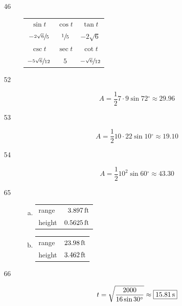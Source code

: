 \documentclass{exam}
\newcommand{\dg}{\ensuremath{^\circ}}
\begin{document}
\begin{description}
      \item[46]
        \begin{tabular}[H]{ccc}
          \toprule

          $\sin t$                  & $\cos t$       & $\tan t$      \\
          $-\sfrac{2 \sqrt{6}}{5}$  & $\sfrac{1}{5}$ & $-2 \sqrt{6}$ \\

          \midrule

          $\csc t$                  & $\sec t$       & $\cot t$ \\
          $-\sfrac{5 \sqrt{6}}{12}$ & $5$            & $-\sfrac{\sqrt{6}}{12}$ \\

          \bottomrule
        \end{tabular}

      \item[52]
        \[
          A = \frac{1}{2} 7 \cdot 9 \sin 72 \dg \approx \boxed{ 29.96 }
        \]

      \item[53]
        \[
          A = \frac{1}{2} 10 \cdot 22 \sin 10 \dg \approx \boxed{ 19.10 }
        \]

      \item[54]
        \[
          A = \frac{1}{2} 10^2 \sin 60 \dg \approx \boxed{ 43.30 }
        \]

      \pagebreak

      \item[65]
        \begin{enumerate}[(a)]
          \item 
            \begin{tabular}[H]{lr}
              \toprule
              range  & $\unit[3.897]{ft}$ \\
              height & $\unit[0.5625]{ft}$ \\
              \bottomrule
            \end{tabular}

          \item 
            \begin{tabular}[H]{lr}
              \toprule
              range  & $\unit[23.98]{ft}$ \\
              height & $\unit[3.462]{ft}$ \\
              \bottomrule
            \end{tabular}
        \end{enumerate}

      \item[66]
        \[
          t = \sqrt{ \frac{2000}{16 \sin 30 \dg}} \approx \boxed{ \unit[15.81]{s} }
        \]

    \end{description}
\end{document}
